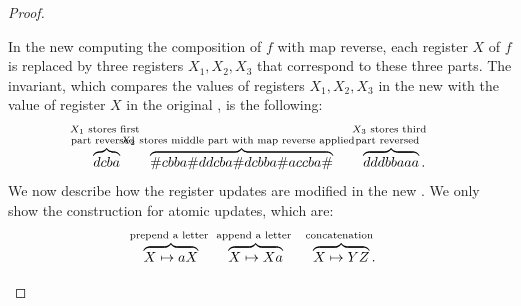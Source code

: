 \begin{proof}
\begin{itemize}
In the new \sst computing the composition of $f$ with map reverse, each register $X$ of $f$ is replaced by three registers $X_1,X_2,X_3$ that correspond to these three parts. The invariant, which compares the values of registers $X_1,X_2,X_3$ in the new \sst with the value of register $X$ in the original \sst, is the following:
\begin{align*}
\myoverbrace{dcba 
}{
    $X_1$ stores first\\ part reversed
}
\qquad
\myoverbrace{\#cbba\#ddcba\#dcbba\#accba\#
}{
    $X_2$ stores middle part with map reverse applied
}
\qquad 
\myoverbrace{dddbbaaa}{
    $X_3$ stores third\\ part reversed
}.
\end{align*}
  We now describe how the register updates are modified in the new \sst. We only show the construction for atomic updates, which are:
 \begin{align*}
 \myoverbrace{X\mapsto  aX}{prepend a letter}
 \qquad 
 \myoverbrace{X\mapsto Xa}{append a letter}
 \qquad 
 \myoverbrace{X\mapsto YZ}{concatenation}.
 \end{align*}


\end{itemize}
\end{proof}
